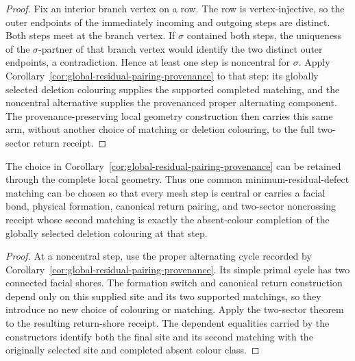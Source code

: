 \begin{proof}
Fix an interior branch vertex on a row.  The row is vertex-injective, so the
outer endpoints of the immediately incoming and outgoing steps are distinct.
Both steps meet at the branch vertex.  If \(\sigma\) contained both steps,
the uniqueness of the \(\sigma\)-partner of that branch vertex would identify
the two distinct outer endpoints, a contradiction.  Hence at least one step
is noncentral for \(\sigma\).  Apply
Corollary~\ref{cor:global-residual-pairing-provenance} to that step: its
globally selected deletion colouring supplies the supported completed
matching, and the noncentral alternative supplies the provenanced proper
alternating component.
The provenance-preserving local geometry construction then carries this same
arm, without another choice of matching or deletion colouring, to the full
two-sector return receipt.
\end{proof}

\begin{corollary}
\label{cor:global-residual-geometry-provenance}
The choice in Corollary~\ref{cor:global-residual-pairing-provenance} can be
retained through the complete local geometry.  Thus one common
minimum-residual-defect matching can be chosen so that every mesh step is
central or carries a facial bond, physical formation, canonical return
pairing, and two-sector noncrossing receipt whose second matching is exactly
the absent-colour completion of the globally selected deletion colouring at
that step.
\end{corollary}

\begin{proof}
At a noncentral step, use the proper alternating cycle recorded by
Corollary~\ref{cor:global-residual-pairing-provenance}.  Its simple primal
cycle has two connected facial shores.  The formation switch and canonical
return construction depend only on this supplied site and its two supported
matchings, so they introduce no new choice of colouring or matching.  Apply
the two-sector theorem to the resulting return-shore receipt.  The dependent
equalities carried by the constructors identify both the final site and its
second matching with the originally selected site and completed absent colour
class.
\end{proof}

